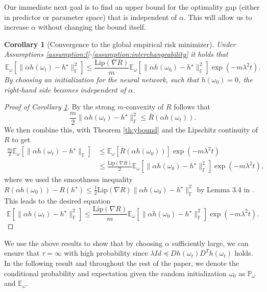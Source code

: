 \documentclass[10pt]{article} %
\newcommand{\bE}{\mathbb{E}}
\newcommand{\bF}{\mathbb{F}}
\newcommand{\bP}{\mathbb{P}}
\newtheorem{corollary}{Corollary}
\begin{document}
Our immediate next goal is to find an upper bound for the optimality gap (either in predictor or parameter space) that is independent of $\alpha$. This will allow us to increase $\alpha$ without changing the bound itself.
\begin{corollary}[Convergence to the global empirical risk minimizer]\label{corollary:ybound}
    Under Assumptions \ref{assumption:l}-\ref{assumption:interchangeability} it holds that 
    \begin{equation*}
        \bE_\omega[\|\alpha h(\omega_t)-h^\star\|^2_\bF]\leq \frac{\mathrm{Lip}(\nabla R)}{m} \bE_\omega[\|\alpha h(\omega_0)-h^\star\|^2_\bF]\exp(-m\lambda^2t).
    \end{equation*}
    By choosing an initialization for the neural network, such that $h(\omega_0)=0$, the right-hand side becomes independent of $\alpha$.
\end{corollary}
\begin{proof}[Proof of Corollary \ref{corollary:ybound}]
    By the strong $m$-convexity of $R$ follows that 
    $$\frac{m}{2}\|\alpha h(\omega_t)-h^\star\|_\bF^2\leq \bar{R}(\alpha h(\omega_t)).$$
    We then combine this, with Theorem \ref{th:ybound} and the Lipschitz continuity of $R$ to get 
    \begin{align*}
        \frac{m}{2}\bE_\omega[\|\alpha h(\omega_t)-h^\star\|_\bF]&\leq \bE_\omega[\bar{R}(\alpha h(\omega_0))]\exp(-m\lambda^2t)\\
        &\leq \frac{\mathrm{Lip}(\nabla R)}{2} \bE_\omega[\|\alpha h(\omega_0)-h^\star\|_\bF^2]\exp(-m\lambda^2t),
    \end{align*}
    where we used the smoothness inequality $R(\alpha h(\omega_0))-R(h^\star)\leq \frac{1}{2}\mathrm{Lip}(\nabla R)\|\alpha h(\omega_0)-h^\star\|_\bF^2$ by Lemma 3.4 in \cite{bubeck2015convex}. This leads to the desired equation 
    $$\bE[\|\alpha h(\omega_t)-h^\star\|_\bF^2]\leq \frac{\mathrm{Lip}(\nabla R)}{m} \bE_\omega[\|\alpha h(\omega_0)-h^\star\|_\bF^2]\exp(-m\lambda^2t).$$
\end{proof}
We use the above results to show that by choosing $\alpha$ sufficiently large, we can ensure that $\tau = \infty$ with high probability since $\lambda Id \preceq Dh(\omega_t)D^Th(\omega_t)$ holds. In the following result and throughout the rest of the paper, we denote the conditional probability and expectation given the random initialization $\omega_0$ as $\bP_\omega$ and $\bE_\omega$.
\end{document}
